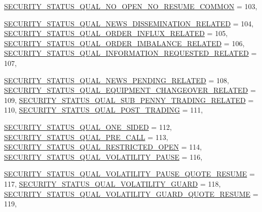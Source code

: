 \begin{CompactItemize}
\hyperlink{namespaceWombat_2de6f22c731ba94169dc24b8054862b851683cd526d0b12c9c1371f632bd0dbc}{SECURITY\_\-STATUS\_\-QUAL\_\-NO\_\-OPEN\_\-NO\_\-RESUME\_\-COMMON} =  103, 
\par
\hyperlink{namespaceWombat_2de6f22c731ba94169dc24b8054862b85c37fdc216dce84df422831eb3a2e4e7}{SECURITY\_\-STATUS\_\-QUAL\_\-NEWS\_\-DISSEMINATION\_\-RELATED} =  104, 
\hyperlink{namespaceWombat_2de6f22c731ba94169dc24b8054862b88c82d160b6cbf53d76d64e6986de828d}{SECURITY\_\-STATUS\_\-QUAL\_\-ORDER\_\-INFLUX\_\-RELATED} =  105, 
\hyperlink{namespaceWombat_2de6f22c731ba94169dc24b8054862b84ac541235f95ea9854ded3b377ad0dfd}{SECURITY\_\-STATUS\_\-QUAL\_\-ORDER\_\-IMBALANCE\_\-RELATED} =  106, 
\hyperlink{namespaceWombat_2de6f22c731ba94169dc24b8054862b86531599f2620a4bd03cb8edf2f92c93e}{SECURITY\_\-STATUS\_\-QUAL\_\-INFORMATION\_\-REQUESTED\_\-RELATED} =  107, 
\par
\hyperlink{namespaceWombat_2de6f22c731ba94169dc24b8054862b8d80bbbfc98a1e13439d598599cef7f0d}{SECURITY\_\-STATUS\_\-QUAL\_\-NEWS\_\-PENDING\_\-RELATED} =  108, 
\hyperlink{namespaceWombat_2de6f22c731ba94169dc24b8054862b80505938161ceae36d93215277d353c39}{SECURITY\_\-STATUS\_\-QUAL\_\-EQUIPMENT\_\-CHANGEOVER\_\-RELATED} =  109, 
\hyperlink{namespaceWombat_2de6f22c731ba94169dc24b8054862b869226befd5d27eb28ae29cc1aff9feb5}{SECURITY\_\-STATUS\_\-QUAL\_\-SUB\_\-PENNY\_\-TRADING\_\-RELATED} =  110, 
\hyperlink{namespaceWombat_2de6f22c731ba94169dc24b8054862b8156eee834114b0b986e32f1e8a5cf0d9}{SECURITY\_\-STATUS\_\-QUAL\_\-POST\_\-TRADING} =  111, 
\par
\hyperlink{namespaceWombat_2de6f22c731ba94169dc24b8054862b82917b9aefe39718a01a22784f112ef9e}{SECURITY\_\-STATUS\_\-QUAL\_\-ONE\_\-SIDED} =  112, 
\hyperlink{namespaceWombat_2de6f22c731ba94169dc24b8054862b89250989d0cbbd581ebba7c83e8879efc}{SECURITY\_\-STATUS\_\-QUAL\_\-PRE\_\-CALL} =  113, 
\hyperlink{namespaceWombat_2de6f22c731ba94169dc24b8054862b8d79600c41c5792b1cafd9e420a7cc931}{SECURITY\_\-STATUS\_\-QUAL\_\-RESTRICTED\_\-OPEN} =  114, 
\hyperlink{namespaceWombat_2de6f22c731ba94169dc24b8054862b82feb5a341af39d6eac5f763b170d2df5}{SECURITY\_\-STATUS\_\-QUAL\_\-VOLATILITY\_\-PAUSE} =  116, 
\par
\hyperlink{namespaceWombat_2de6f22c731ba94169dc24b8054862b889719de56e98c5f803ab6e395c401b77}{SECURITY\_\-STATUS\_\-QUAL\_\-VOLATILITY\_\-PAUSE\_\-QUOTE\_\-RESUME} =  117, 
\hyperlink{namespaceWombat_2de6f22c731ba94169dc24b8054862b8e586d302769344481996c7c3a0eaf62b}{SECURITY\_\-STATUS\_\-QUAL\_\-VOLATILITY\_\-GUARD} =  118, 
\hyperlink{namespaceWombat_2de6f22c731ba94169dc24b8054862b86042673d45f786d1a81abd04b7c8059f}{SECURITY\_\-STATUS\_\-QUAL\_\-VOLATILITY\_\-GUARD\_\-QUOTE\_\-RESUME} =  119, 

\end{CompactItemize}
